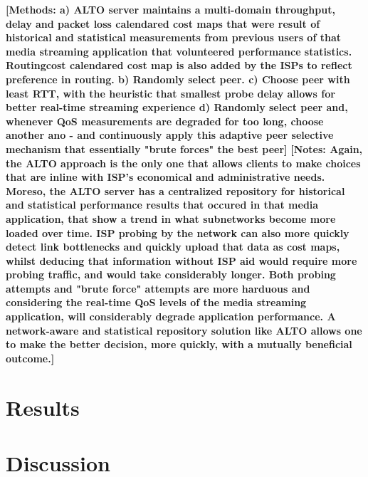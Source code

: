     \textbf{[Methods: a) ALTO server maintains a multi-domain throughput, delay and packet loss calendared cost maps that were result of historical and statistical measurements from previous users of that media streaming application that volunteered performance statistics. Routingcost calendared cost map is also added by the ISPs to reflect preference in routing. b) Randomly select peer. c) Choose peer with least RTT, with the heuristic that smallest probe delay allows for better real-time streaming experience d) Randomly select peer and, whenever QoS measurements are degraded for too long, choose another ano - and continuously apply this adaptive peer selective mechanism that essentially "brute forces" the best peer]}
\textbf{[Notes: Again, the ALTO approach is the only one that allows clients to make choices that are inline with ISP's economical and administrative needs. Moreso, the ALTO server has a centralized repository for historical and statistical performance results that occured in that media application, that show a trend in what subnetworks become more loaded over time. ISP probing by the network can also more quickly detect link bottlenecks and quickly upload that data as cost maps, whilst deducing that information without ISP aid would require more probing traffic, and would take considerably longer. Both probing attempts and "brute force" attempts are more harduous and considering the real-time QoS levels of the media streaming application, will considerably degrade application performance. A network-aware and statistical repository solution like ALTO allows one to make the better decision, more quickly, with a mutually beneficial outcome.]}

\section{Results}
\section{Discussion}


